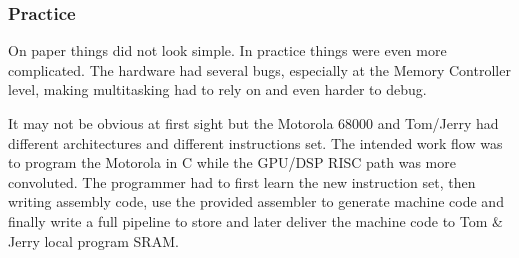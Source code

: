\subsubsection{Practice}
On paper things did not look simple. In practice things were even more complicated. The hardware had several bugs, especially at the Memory Controller level, making multitasking had to rely on and even harder to debug.\\
\par
It may not be obvious at first sight but the Motorola 68000 and Tom/Jerry had different architectures and different instructions set. The intended work flow was to program the Motorola in C while the GPU/DSP RISC path was more convoluted. The programmer had to first learn the new instruction set, then writing assembly code, use the provided assembler to generate machine code and finally write a full pipeline to store and later deliver the machine code to Tom \& Jerry local program SRAM.\\
\par











